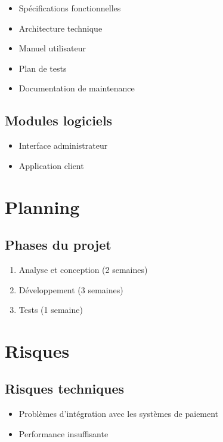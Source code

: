 \documentclass[12pt,a4paper]{article}
\begin{document}
\begin{itemize}
\item Spécifications fonctionnelles
\item Architecture technique
\item Manuel utilisateur
\item Plan de tests
\item Documentation de maintenance
\end{itemize}

\subsection{Modules logiciels}

\begin{itemize}
\item Interface administrateur
\item Application client
\end{itemize}

\section{Planning}

\subsection{Phases du projet}

\begin{enumerate}
\item Analyse et conception (2 semaines)
\item Développement (3 semaines)
\item Tests (1 semaine)
\end{enumerate}

\section{Risques}

\subsection{Risques techniques}

\begin{itemize}
\item Problèmes d'intégration avec les systèmes de paiement
\item Performance insuffisante
\end{itemize}
\end{document}
